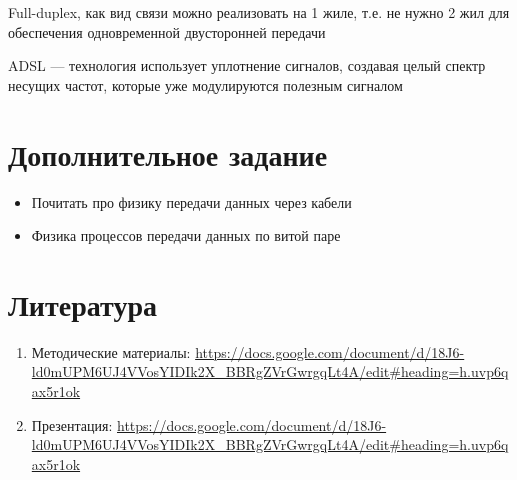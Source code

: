 \documentclass[a4paper]{article}
\begin{document}
Full-duplex, как вид связи можно реализовать на 1 жиле, т.е. не нужно 2 жил для обеспечения одновременной двусторонней передачи

ADSL --- технология использует уплотнение сигналов, создавая целый спектр несущих частот, которые уже модулируются полезным сигналом



\section{Дополнительное задание}
\begin{itemize}
	\item Почитать про физику передачи данных через кабели
	\item Физика процессов передачи данных по витой паре
\end{itemize}

\section{Литература}
\begin{enumerate}
	\item Методические материалы: \url{https://docs.google.com/document/d/18J6-ld0mUPM6UJ4VVosYIDIk2X_BBRgZVrGwrgqLt4A/edit#heading=h.uvp6qax5r1ok}
	\item Презентация: \url{https://docs.google.com/document/d/18J6-ld0mUPM6UJ4VVosYIDIk2X_BBRgZVrGwrgqLt4A/edit#heading=h.uvp6qax5r1ok}
\end{enumerate}
\end{document}
